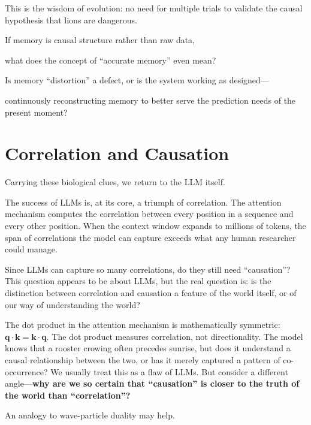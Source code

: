 This is the wisdom of evolution: no need for multiple trials to validate the causal hypothesis that lions are dangerous.

\begin{thinkbox}[思考]
If memory is causal structure rather than raw data,

what does the concept of ``accurate memory'' even mean?

Is memory ``distortion'' a defect, or is the system working as designed---

continuously reconstructing memory to better serve the prediction needs of the present moment?
\end{thinkbox}

\newpage
\section{Correlation and Causation}

Carrying these biological clues, we return to the LLM itself.

The success of LLMs is, at its core, a triumph of correlation. The attention mechanism computes the correlation between every position in a sequence and every other position. When the context window expands to millions of tokens, the span of correlations the model can capture exceeds what any human researcher could manage.

\vspace{0.8em}

Since LLMs can capture so many correlations, do they still need ``causation''?
This question appears to be about LLMs, but the real question is: is the distinction between correlation and causation a feature of the world itself, or of our way of understanding the world?


The dot product in the attention mechanism is mathematically symmetric:
$\bm{q} \cdot \bm{k} = \bm{k} \cdot \bm{q}$.
The dot product measures correlation, not directionality. The model knows that a rooster crowing often precedes sunrise, but does it understand a causal relationship between the two, or has it merely captured a pattern of co-occurrence?
We usually treat this as a flaw of LLMs. But consider a different angle---\textbf{why are we so certain that ``causation'' is closer to the truth of the world than ``correlation''?}

\vspace{0.8em}

An analogy to wave-particle duality may help.

